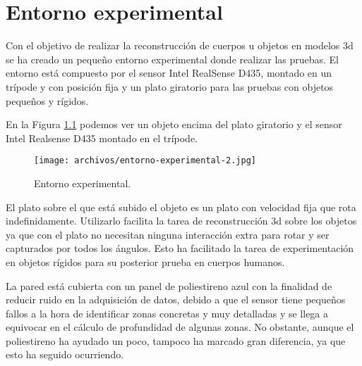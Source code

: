 \chapter{Entorno experimental}

Con el objetivo de realizar la reconstrucción de cuerpos u objetos en modelos \gls{3d} se ha creado un pequeño entorno experimental donde realizar las pruebas.
El entorno está compuesto por el sensor Intel RealSense D435, montado en un trípode y con posición fija y un plato giratorio para las pruebas con objetos pequeños y rígidos.

En la Figura \ref{fig:entorno-experimental} podemos ver un objeto encima del plato giratorio y el sensor Intel Realsense D435 montado en el trípode.

\begin{figure}[h]
    \centering
    \texttt{[image: archivos/entorno-experimental-2.jpg]}
    \caption{Entorno experimental.}
    \label{fig:entorno-experimental}
\end{figure}

El plato sobre el que está subido el objeto es un plato con velocidad fija que rota indefinidamente.
Utilizarlo facilita la tarea de reconstrucción \gls{3d} sobre los objetos ya que con el plato no necesitan ninguna interacción extra para rotar y ser capturados por todos los ángulos.
Esto ha facilitado la tarea de experimentación en objetos rígidos para su posterior prueba en cuerpos humanos.

La pared está cubierta con un panel de poliestireno azul con la finalidad de reducir ruido en la adquisición de datos, debido a que el sensor tiene pequeños fallos a la hora de identificar zonas concretas y muy detalladas y se llega a equivocar en el cálculo de profundidad de algunas zonas.
No obstante, aunque el poliestireno ha ayudado un poco, tampoco ha marcado gran diferencia, ya que esto ha seguido ocurriendo.

